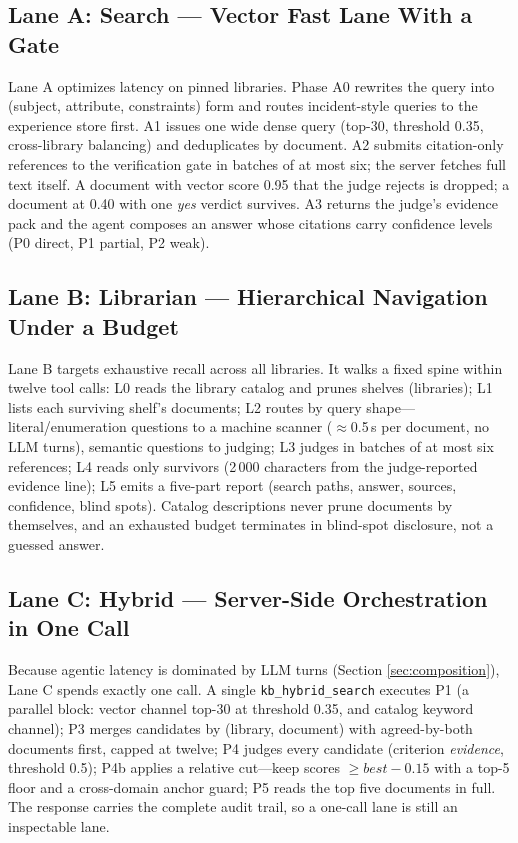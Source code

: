 \documentclass[journal]{IEEEtran}
\begin{document}
\subsection{Lane A: Search --- Vector Fast Lane With a Gate}
Lane A optimizes latency on pinned libraries. Phase A0 rewrites the query
into (subject, attribute, constraints) form and routes incident-style
queries to the experience store first. A1 issues one wide dense query
(top-30, threshold 0.35, cross-library balancing) and deduplicates by
document. A2 submits citation-only references to the verification gate in
batches of at most six; the server fetches full text itself. A document
with vector score 0.95 that the judge rejects is dropped; a document at
0.40 with one \emph{yes} verdict survives. A3 returns the judge's
evidence pack and the agent composes an answer whose citations carry
confidence levels (P0 direct, P1 partial, P2 weak).

\subsection{Lane B: Librarian --- Hierarchical Navigation Under a Budget}
Lane B targets exhaustive recall across all libraries. It walks a fixed
spine within twelve tool calls: L0 reads the library catalog and prunes
shelves (libraries); L1 lists each surviving shelf's documents;
L2 routes by query shape---literal/enumeration questions to a machine
scanner ($\approx$0.5\,s per document, no LLM turns), semantic questions
to judging; L3 judges in batches of at most six references; L4 reads only
survivors (2\,000 characters from the judge-reported evidence line); L5
emits a five-part report (search paths, answer, sources, confidence,
blind spots). Catalog descriptions never prune documents by themselves,
and an exhausted budget terminates in blind-spot disclosure, not a
guessed answer.

\subsection{Lane C: Hybrid --- Server-Side Orchestration in One Call}
Because agentic latency is dominated by LLM turns (Section
\ref{sec:composition}), Lane C spends exactly one call. A single
\texttt{kb\_hybrid\_search} executes P1 (a parallel block: vector channel
top-30 at threshold 0.35, and catalog keyword channel); P3 merges
candidates by (library, document) with agreed-by-both documents first,
capped at twelve; P4 judges every candidate (criterion \emph{evidence},
threshold 0.5); P4b applies a relative cut---keep scores
$\geq \mathit{best}-0.15$ with a top-5 floor and a cross-domain anchor
guard; P5 reads the top five documents in full. The response carries the
complete audit trail, so a one-call lane is still an inspectable lane.
\end{document}
